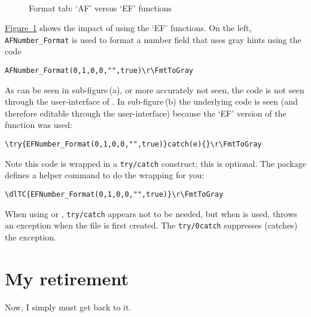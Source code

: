 \documentclass{article}
\begin{document}
\begin{figure}[htb]
\begin{minipage}[t]{.5\linewidth-2.5pt}\kern0pt\centering
{}%
\end{minipage}\hfill
\begin{minipage}[t]{.5\linewidth-2.5pt}\kern0pt\centering
{}%
\end{minipage}\\[3pt]
\hfill
{}%
\caption{Format tab: `AF' versus `EF' functions}\label{fig:AltAdbFncs}
\end{figure}

\hyperref[fig:AltAdbFncs]{Figure~\ref*{fig:AltAdbFncs}} shows the impact of using the `EF' functions. On the left,
\texttt{AFNumber\_Format} is used to format a number field that uses gray hints using the code
\begin{Verbatim}[xleftmargin=\parindent]
AFNumber_Format(0,1,0,0,"",true)\r\FmtToGray
\end{Verbatim}
As can be seen in sub-figure\,(a), or more accurately not seen, the code is
not seen through the user-interface of . In sub-figure\,(b) the
underlying code is seen (and therefore editable through the user-interface)
because the `EF' version of the function was used:
\begin{Verbatim}[xleftmargin=\parindent]
\try{EFNumber_Format(0,1,0,0,"",true)}catch(e){}\r\FmtToGray
\end{Verbatim}
Note this code is wrapped in a \texttt{try/catch} construct; this is
optional. The  package defines a helper command  to do the wrapping for you:
\begin{Verbatim}[xleftmargin=\parindent]
\dlTC{EFNumber_Format(0,1,0,0,"",true)}\r\FmtToGray
\end{Verbatim}
When using  or , \texttt{try/catch} appears not to
be needed, but when  is used,  throws an
exception when the file is first created. The \texttt{try/\penalty0catch} suppresses
(catches) the exception.


\section{My retirement}

Now, I simply must get back to it. \dps
\end{document}
